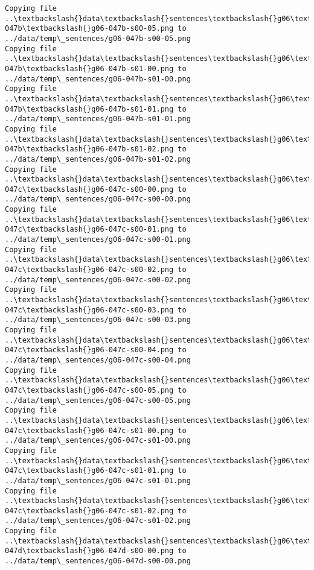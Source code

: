 \documentclass[11pt]{article}
\begin{document}
\begin{Verbatim}[commandchars=\\\{\}]
Copying file ..\textbackslash{}data\textbackslash{}sentences\textbackslash{}g06\textbackslash{}g06-047b\textbackslash{}g06-047b-s00-05.png to
../data/temp\_sentences/g06-047b-s00-05.png
Copying file ..\textbackslash{}data\textbackslash{}sentences\textbackslash{}g06\textbackslash{}g06-047b\textbackslash{}g06-047b-s01-00.png to
../data/temp\_sentences/g06-047b-s01-00.png
Copying file ..\textbackslash{}data\textbackslash{}sentences\textbackslash{}g06\textbackslash{}g06-047b\textbackslash{}g06-047b-s01-01.png to
../data/temp\_sentences/g06-047b-s01-01.png
Copying file ..\textbackslash{}data\textbackslash{}sentences\textbackslash{}g06\textbackslash{}g06-047b\textbackslash{}g06-047b-s01-02.png to
../data/temp\_sentences/g06-047b-s01-02.png
Copying file ..\textbackslash{}data\textbackslash{}sentences\textbackslash{}g06\textbackslash{}g06-047c\textbackslash{}g06-047c-s00-00.png to
../data/temp\_sentences/g06-047c-s00-00.png
Copying file ..\textbackslash{}data\textbackslash{}sentences\textbackslash{}g06\textbackslash{}g06-047c\textbackslash{}g06-047c-s00-01.png to
../data/temp\_sentences/g06-047c-s00-01.png
Copying file ..\textbackslash{}data\textbackslash{}sentences\textbackslash{}g06\textbackslash{}g06-047c\textbackslash{}g06-047c-s00-02.png to
../data/temp\_sentences/g06-047c-s00-02.png
Copying file ..\textbackslash{}data\textbackslash{}sentences\textbackslash{}g06\textbackslash{}g06-047c\textbackslash{}g06-047c-s00-03.png to
../data/temp\_sentences/g06-047c-s00-03.png
Copying file ..\textbackslash{}data\textbackslash{}sentences\textbackslash{}g06\textbackslash{}g06-047c\textbackslash{}g06-047c-s00-04.png to
../data/temp\_sentences/g06-047c-s00-04.png
Copying file ..\textbackslash{}data\textbackslash{}sentences\textbackslash{}g06\textbackslash{}g06-047c\textbackslash{}g06-047c-s00-05.png to
../data/temp\_sentences/g06-047c-s00-05.png
Copying file ..\textbackslash{}data\textbackslash{}sentences\textbackslash{}g06\textbackslash{}g06-047c\textbackslash{}g06-047c-s01-00.png to
../data/temp\_sentences/g06-047c-s01-00.png
Copying file ..\textbackslash{}data\textbackslash{}sentences\textbackslash{}g06\textbackslash{}g06-047c\textbackslash{}g06-047c-s01-01.png to
../data/temp\_sentences/g06-047c-s01-01.png
Copying file ..\textbackslash{}data\textbackslash{}sentences\textbackslash{}g06\textbackslash{}g06-047c\textbackslash{}g06-047c-s01-02.png to
../data/temp\_sentences/g06-047c-s01-02.png
Copying file ..\textbackslash{}data\textbackslash{}sentences\textbackslash{}g06\textbackslash{}g06-047d\textbackslash{}g06-047d-s00-00.png to
../data/temp\_sentences/g06-047d-s00-00.png

\end{Verbatim}
\end{document}
